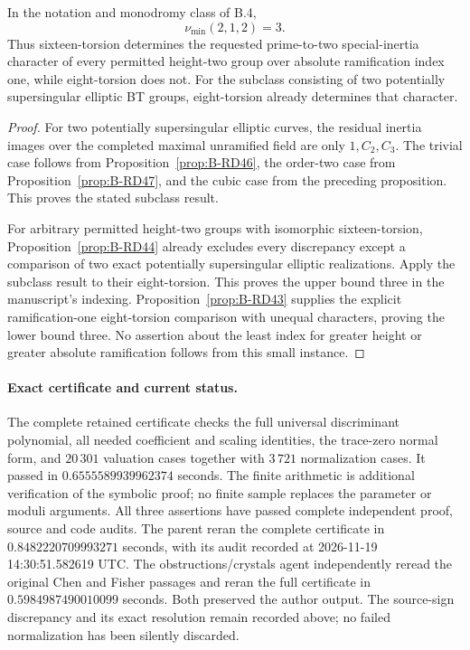 \begin{theorem}
\label{thm:B-RD48}
In the notation and monodromy class of B.4,
\[
                            \nu_{\min}(2,1,2)=3.
\]
Thus sixteen-torsion determines the requested prime-to-two
special-inertia character of every permitted height-two group
over absolute ramification index one, while eight-torsion does not.
For the subclass consisting of two potentially supersingular
elliptic BT groups, eight-torsion already determines that character.
\end{theorem}
\begin{proof}
For two potentially supersingular elliptic curves, the residual
inertia images over the completed maximal unramified field are
only $1,C_2,C_3$. The trivial case follows from
Proposition~\ref{prop:B-RD46}, the order-two case from
Proposition~\ref{prop:B-RD47}, and the cubic case from the
preceding proposition. This proves the stated subclass result.

For arbitrary permitted height-two groups with isomorphic
sixteen-torsion, Proposition~\ref{prop:B-RD44} already excludes
every discrepancy except a comparison of two exact potentially
supersingular elliptic realizations. Apply the subclass result
to their eight-torsion. This proves the upper bound three in
the manuscript's indexing. Proposition~\ref{prop:B-RD43}
supplies the explicit ramification-one eight-torsion comparison
with unequal characters, proving the lower bound three.
No assertion about the least index for greater height or
greater absolute ramification follows from this small instance.
\end{proof}

\paragraph{Exact certificate and current status.}
The complete retained certificate
checks the full universal discriminant polynomial, all needed
coefficient and scaling identities, the trace-zero normal form,
and $20\,301$ valuation cases together with $3\,721$ normalization
cases. It passed in $0.6555589939962374$ seconds.
The finite arithmetic is additional verification of the symbolic
proof; no finite sample replaces the parameter or moduli arguments.
All three assertions have passed complete independent proof,
source and code audits. The parent reran the complete certificate
in $0.8482220709993271$ seconds, with its audit recorded at
2026-11-19 14:30:51.582619 UTC. The obstructions/crystals agent
independently reread the original Chen and Fisher passages and
reran the full certificate in $0.5984987490010099$ seconds.
Both preserved the author output. The source-sign discrepancy
and its exact resolution remain recorded above; no failed
normalization has been silently discarded.
